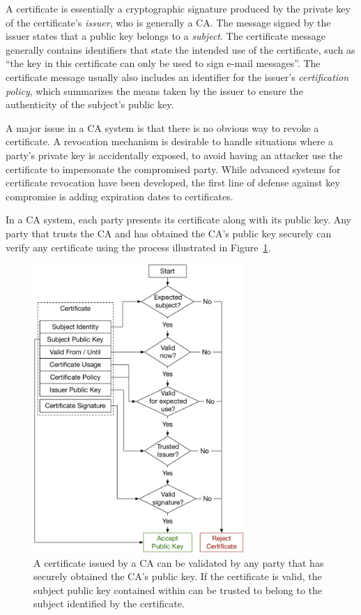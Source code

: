 A certificate is essentially a cryptographic signature produced by the private
key of the certificate's \textit{issuer}, who is generally a CA. The message
signed by the issuer states that a public key belongs to a \textit{subject}.
The certificate message generally contains identifiers that state the intended
use of the certificate, such as ``the key in this certificate can only be used
to sign e-mail messages''. The certificate message usually also includes an
identifier for the issuer's \textit{certification policy}, which summarizes the
means taken by the issuer to ensure the authenticity of the subject's public
key.

A major issue in a CA system is that there is no obvious way to revoke a
certificate. A revocation mechanism is desirable to handle situations where a
party's private key is accidentally exposed, to avoid having an attacker use
the certificate to impersonate the compromised party. While advanced systems
for certificate revocation have been developed, the first line of defense
against key compromise is adding expiration dates to certificates.

In a CA system, each party presents its certificate along with its public key.
Any party that trusts the CA and has obtained the CA's public key securely can
verify any certificate using the process illustrated in
Figure~\ref{fig:certificate_validation}.

\begin{figure}[hbt]
  \centering
  \includegraphics[width=80mm]{figures/certificate_validation.pdf}
  \caption{
    A certificate issued by a CA can be validated by any party that has
    securely obtained the CA's public key. If the certificate is valid, the
    subject public key contained within can be trusted to belong to the subject
    identified by the certificate.
  }
  \label{fig:certificate_validation}
\end{figure}

